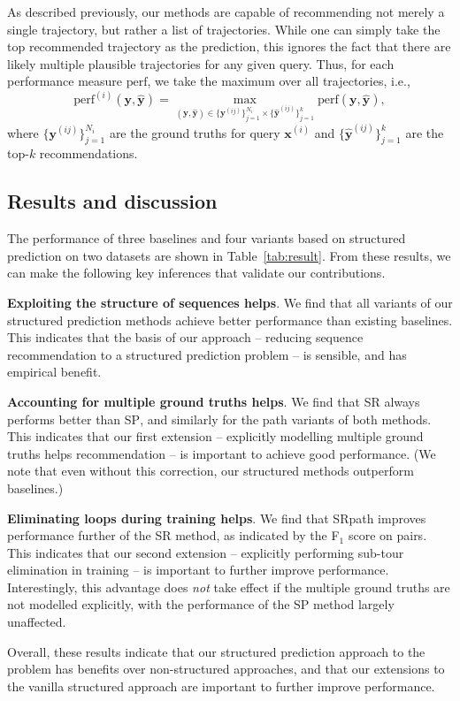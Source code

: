 As described previously, our methods are capable of recommending not merely a single trajectory,
but rather a list of trajectories.
While one can simply take the top recommended trajectory as the prediction,
this ignores the fact that there are likely multiple plausible trajectories for any given query.
Thus, for each performance measure $\mathrm{perf}$,
we take the maximum over all trajectories,
i.e.,
\begin{equation*}
\mathrm{perf}^{(i)}( \mathbf{y}, \hat{\mathbf{y}} ) =
\max_{(\mathbf{y}, \hat{\mathbf{y}}) \in \{\mathbf{y}^{(ij)}\}_{j=1}^{N_i} \times \{\hat{\mathbf{y}}^{(ij)}\}_{j=1}^k} 
\mathrm{perf}(\mathbf{y}, {\hat{\mathbf{y}}}),
\end{equation*}
where $\{\mathbf{y}^{(ij)}\}_{j=1}^{N_i}$ are the ground truths for query $\mathbf{x}^{(i)}$ and
$\{\hat{\mathbf{y}}^{(ij)}\}_{j=1}^k$ are the top-$k$ recommendations.



%
\subsection{Results and discussion}
\label{sec:result}



The performance of three baselines and four variants based on structured prediction on two datasets are shown in Table~\ref{tab:result}.
From these results, we can make the following key inferences that validate our contributions.

\textbf{Exploiting the structure of sequences helps}.
We find that all variants of our structured prediction methods achieve better performance than existing baselines.
This indicates that the basis of our approach -- reducing sequence recommendation to a structured prediction problem -- is sensible, and has empirical benefit.

\textbf{Accounting for multiple ground truths helps}.
We find that \textsc{SR} always performs better than \textsc{SP},
and similarly for the {\sc path} variants of both methods. 
This indicates that our first extension -- explicitly modelling multiple ground truths helps recommendation -- is important to achieve good performance.
(We note that even without this correction, our structured methods outperform baselines.)

\textbf{Eliminating loops during training helps}.
We find that {\sc SRpath} improves performance further of the {\sc SR} method,
as indicated by the F$_1$ score on pairs.
This indicates that our second extension -- explicitly performing sub-tour elimination in training -- is important to further improve performance.
Interestingly,
this advantage does \emph{not} take effect if the multiple ground truths are not modelled explicitly,
with the performance of the {\sc SP} method largely unaffected.

Overall, these results indicate that our structured prediction approach to the problem has
benefits over non-structured approaches,
and that our extensions to the vanilla structured approach are important to further improve performance.
